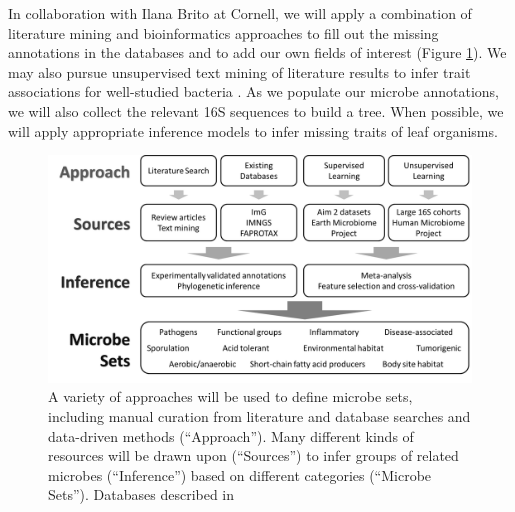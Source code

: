 \documentclass[12pt]{article}
\begin{document}
In collaboration with Ilana Brito at Cornell, we will apply a 
combination of literature mining and bioinformatics approaches to fill 
out the missing annotations in the databases and to add our own fields 
of interest (Figure \ref{fig:microbe_sets}). We may also 
pursue unsupervised text mining of literature results to infer trait 
associations for well-studied bacteria \cite{korbel-lit_mining-2005}. As we populate 
our microbe annotations, we will also collect the relevant 16S sequences to 
build a tree. When possible, we will apply appropriate inference models to infer 
missing traits of leaf organisms.

\begin{figure}
\begin{center}
	\includegraphics[scale=0.5]{microbe_sets}
	\caption{A variety of approaches will be used to define
	microbe sets, including manual curation from literature
	and database searches and data-driven methods (``Approach'').
	Many different kinds of resources will be drawn upon 
	(``Sources'') to infer groups of related microbes 
	(``Inference'') based on different categories 
	(``Microbe Sets''). Databases described in \cite{markowitz-img-2013, louca-faprotax-2016, lagkouvardos-imngs-2016}}
	\label{fig:microbe_sets}
\end{center}
\end{figure}
\end{document}
